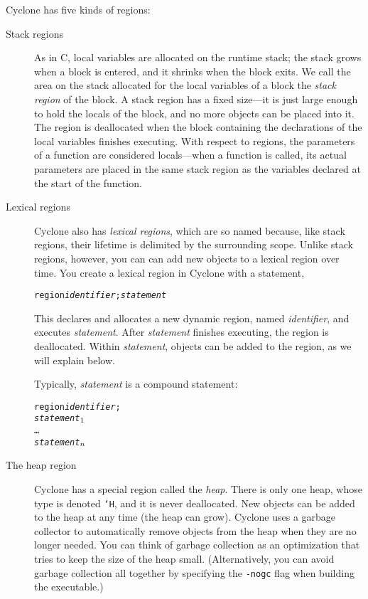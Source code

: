 Cyclone has five kinds of regions:
\begin{description}
\item[Stack regions] As in C, local variables are allocated on the
  runtime stack; the stack grows when a block is entered, and it
  shrinks when the block exits.  We call the area on the stack
  allocated for the local variables of a block the \emph{stack region}
  of the block.  A stack region has a fixed size---it is just large
  enough to hold the locals of the block, and no more objects can be
  placed into it.  The region is deallocated when the block containing
  the declarations of the local variables finishes executing.  With
  respect to regions, the parameters of a function are considered
  locals---when a function is called, its actual parameters are placed
  in the same stack region as the variables declared at the start of
  the function.
  
\item[Lexical regions] Cyclone also has \emph{lexical regions}, which are so
  named because, like stack regions, their lifetime is delimited by the
  surrounding scope.  Unlike stack regions, however, you can can add new
  objects to a lexical region over time.  You create a lexical region in
  Cyclone with a statement,
\begin{alltt}
  region {\it identifier}; {\it statement}
\end{alltt}
  This declares and allocates a new dynamic region, named
  \textit{identifier}, and executes \textit{statement}.  After
  \textit{statement} finishes executing, the region is deallocated.
  Within \textit{statement}, objects can be added to the region, as we
  will explain below.

  Typically, \textit{statement} is a compound statement:
\begin{alltt}
  \lb region \textit{identifier};
    {\it statement}\(\sb{1}\)
    \ldots
    {\it statement}\(\sb{n}\)
  \rb
\end{alltt}

\item[The heap region] Cyclone has a special region called the
  \emph{heap}. There is only one heap, whose type is denoted \texttt{`H},
  and it is never deallocated.  New objects can be added to the heap at any
  time (the heap can grow).  Cyclone uses a garbage collector to
  automatically remove objects from the heap when they are no longer needed.
  You can think of garbage collection as an optimization that tries to keep
  the size of the heap small.  (Alternatively, you can avoid garbage
  collection all together by specifying the \texttt{-nogc} flag when
  building the executable.)


\end{description}
